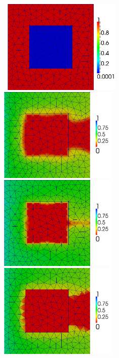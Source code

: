 \begin{figure}[h]
\vbox{
\hbox{
\hspace{3.5cm} \includegraphics[width=0.5\textwidth]{./diagrams/square_permeability_low}}
\vspace{0.5cm}
\hbox{
\hspace{-0.cm}\includegraphics[width=0.5\textwidth]{./diagrams/cg_square_015_low}
\hspace{-0.cm}\includegraphics[width=0.5\textwidth]{./diagrams/cg_square_05_low}}
\vspace{0.5cm}
\hbox{
\hspace{-0.cm}\includegraphics[width=0.5\textwidth]{./diagrams/dg_square_015_low}
}}
\end{figure}

